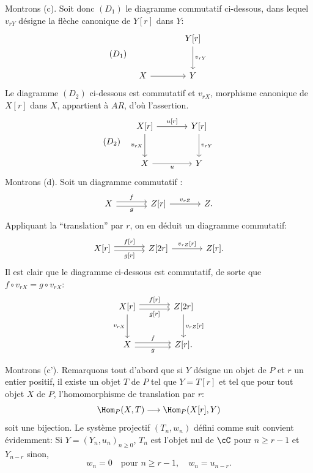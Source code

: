 Montrons (c). Soit donc $(D_1)$ le diagramme commutatif ci-dessous, dans lequel $v_{rY}$ désigne la flèche canonique de $Y[r]$ dans $Y$:
\[
(D_1)\quad
\begin{tikzcd}[column sep=large,row sep=large]
& Y[r] \arrow[d,"{v_{rY}}"]\\
X \arrow[r] & Y
\end{tikzcd}
\]
Le diagramme $(D_2)$ ci-dessous est commutatif et $v_{rX}$, morphisme canonique de $X[r]$ dans $X$, appartient à $AR$, d'où l'assertion.
\[
(D_2)\quad
\begin{tikzcd}[column sep=large,row sep=large]
X[r] \arrow[r,"{u[r]}"] \arrow[d,"{v_{rX}}"'] & Y[r] \arrow[d,"{v_{rY}}"]\\
X \arrow[r,"u"'] & Y
\end{tikzcd}
\]
Montrons (d). Soit un diagramme commutatif :
\[
\begin{tikzcd}[column sep=large]
X \arrow[r,shift left,"f"] \arrow[r,shift right,"g"'] & Z[r] \arrow[r,"{v_{rZ}}"] & Z .
\end{tikzcd}
\]
Appliquant la ``translation'' par $r$, on en déduit un diagramme commutatif:
\[
\begin{tikzcd}[column sep=large]
X[r] \arrow[r,shift left,"{f[r]}"] \arrow[r,shift right,"{g[r]}"'] & Z[2r] \arrow[r,"{v_{rZ}[r]}"] & Z[r].
\end{tikzcd}
\]
Il est clair que le diagramme ci-dessous est commutatif, de sorte que $f\circ v_{rX}=g\circ v_{rX}$:
\[
\begin{tikzcd}[column sep=large,row sep=large]
X[r] \arrow[r,shift left,"{f[r]}"] \arrow[r,shift right,"{g[r]}"'] \arrow[d,"{v_{rX}}"'] & Z[2r] \arrow[d,"{v_{rZ}[r]}"]\\
X \arrow[r,shift left,"f"] \arrow[r,shift right,"g"'] & Z[r] .
\end{tikzcd}
\]

Montrons (c'). Remarquons tout d'abord que si $Y$ désigne un objet de $P$ et $r$ un entier positif, il existe un objet $T$ de $P$ tel que $Y=T[r]$ et tel que pour tout objet $X$ de $P$, l'homomorphisme de translation par $r$:
\[
\Hom_P(X,T)\longrightarrow\Hom_P(X[r],Y)
\]
soit une bijection. Le système projectif $(T_n,w_n)$ défini comme suit convient évidemment:
Si $Y=(Y_n,u_n)_{n\ge 0}$, $T_n$ est l'objet nul de $\cC$ pour $n\ge r-1$ et $Y_{n-r}$ sinon,
\[
w_n=0\quad\text{pour } n\ge r-1,\quad w_n=u_{n-r}.
\]

